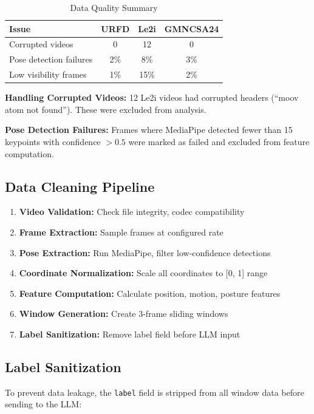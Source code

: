 \documentclass[conference]{IEEEtran}
\begin{document}
\begin{table}[H]
\centering
\caption{Data Quality Summary}
\label{tab:data_quality}
\begin{tabular}{lccc}
\toprule
\textbf{Issue} & \textbf{URFD} & \textbf{Le2i} & \textbf{GMNCSA24} \\
\midrule
Corrupted videos & 0 & 12 & 0 \\
Pose detection failures & 2\% & 8\% & 3\% \\
Low visibility frames & 1\% & 15\% & 2\% \\
\bottomrule
\end{tabular}
\end{table}

\textbf{Handling Corrupted Videos:} 12 Le2i videos had corrupted headers (``moov atom not found''). These were excluded from analysis.

\textbf{Pose Detection Failures:} Frames where MediaPipe detected fewer than 15 keypoints with confidence $> 0.5$ were marked as failed and excluded from feature computation.

\subsection{Data Cleaning Pipeline}

\begin{enumerate}[leftmargin=*]
    \item \textbf{Video Validation:} Check file integrity, codec compatibility
    \item \textbf{Frame Extraction:} Sample frames at configured rate
    \item \textbf{Pose Extraction:} Run MediaPipe, filter low-confidence detections
    \item \textbf{Coordinate Normalization:} Scale all coordinates to [0, 1] range
    \item \textbf{Feature Computation:} Calculate position, motion, posture features
    \item \textbf{Window Generation:} Create 3-frame sliding windows
    \item \textbf{Label Sanitization:} Remove label field before LLM input
\end{enumerate}

\subsection{Label Sanitization}

To prevent data leakage, the \texttt{label} field is stripped from all window data before sending to the LLM:
\end{document}
